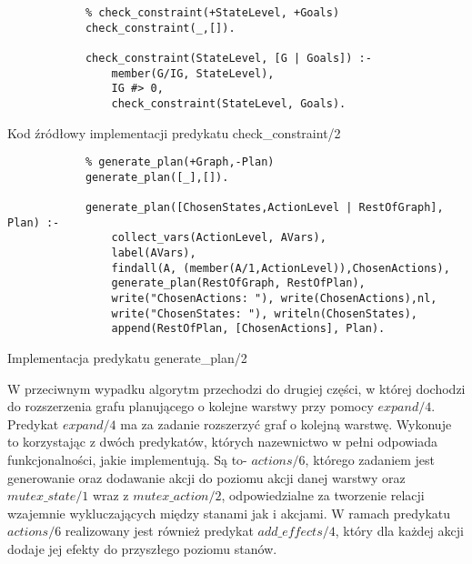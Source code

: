     \begin{listing}[H]
        \begin{verbatim}
            % check_constraint(+StateLevel, +Goals)
            check_constraint(_,[]).

            check_constraint(StateLevel, [G | Goals]) :-
                member(G/IG, StateLevel),
                IG #> 0,
                check_constraint(StateLevel, Goals).
    \end{verbatim}
    \caption{Kod źródłowy implementacji predykatu check\_constraint/2}
    \end{listing}

    \begin{listing}[H]
        \begin{verbatim}
            % generate_plan(+Graph,-Plan)
            generate_plan([_],[]).

            generate_plan([ChosenStates,ActionLevel | RestOfGraph], Plan) :-
                collect_vars(ActionLevel, AVars),
                label(AVars),
                findall(A, (member(A/1,ActionLevel)),ChosenActions),
                generate_plan(RestOfGraph, RestOfPlan),
                write("ChosenActions: "), write(ChosenActions),nl,
                write("ChosenStates: "), writeln(ChosenStates),
                append(RestOfPlan, [ChosenActions], Plan).
    \end{verbatim}
    \caption{Implementacja predykatu generate\_plan/2}
    \end{listing}

    W przeciwnym wypadku  algorytm przechodzi do drugiej części, 
    w której dochodzi do rozszerzenia grafu planującego o kolejne warstwy przy pomocy $expand/4$. 
    Predykat $expand/4$ ma za zadanie rozszerzyć graf o kolejną warstwę. Wykonuje to korzystając z dwóch predykatów, których nazewnictwo w pełni 
    odpowiada funkcjonalności, jakie implementują. Są to- $actions/6$, którego zadaniem jest generowanie oraz dodawanie akcji do poziomu akcji 
    danej warstwy oraz $mutex\_state/1$ wraz z $mutex\_action/2$, odpowiedzialne za tworzenie relacji wzajemnie wykluczających między stanami jak i akcjami.
    W ramach predykatu $actions/6$ realizowany jest również predykat $add\_effects/4$, który dla każdej akcji dodaje jej efekty do przyszłego 
    poziomu stanów.
    
